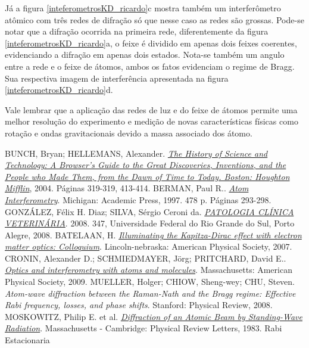 	\par Já a figura \ref{inteferometrosKD_ricardo}c mostra também um interferômetro atômico com três redes de difração só que nesse caso as redes são grossas. Pode-se notar que a difração ocorrida na primeira rede, diferentemente da figura \ref{inteferometrosKD_ricardo}a, o feixe é dividido em apenas dois feixes coerentes, evidenciando a difração em apenas dois estados. Nota-se também um angulo entre a rede e o feixe de átomos, ambos os fatos evidenciam o regime de Bragg. Sua respectiva imagem de interferência apresentada na figura \ref{inteferometrosKD_ricardo}d.
	
	\par Vale lembrar que a aplicação das redes de luz e do feixe de átomos permite uma melhor resolução do experimento e medição de novas características físicas como rotação e ondas gravitacionais devido a massa associado dos átomo.

  BUNCH, Bryan; HELLEMANS, Alexander. \href{https://www.scribd.com/doc/150209428/The-History-of-Science-and-Technology}\textit{The History of Science and Technology: A Browser's Guide to the Great Discoveries, Inventions, and the People who Made Them, from the Dawn of Time to Today. Boston: Houghton Mifflin}, 2004. Páginas 319-319, 413-414.
  BERMAN, Paul R.. \href{https://www.scribd.com/read/282500311/Atom-Interferometry}\textit{Atom Interferometry}. Michigan: Academic Press, 1997. 478 p. Páginas 293-298.
  GONZÁLEZ, Félix H. Diaz; SILVA, Sérgio Ceroni da. \href{https://www.ufrgs.br/lacvet/livros/Analises_Clinicas_Vet.pdf}\textit{PATOLOGIA CLÍNICA VETERINÁRIA}. 2008. 347, Universidade Federal do Rio Grande do Sul, Porto Alegre, 2008.
  BATELAAN, H. \href{https://journals.aps.org/rmp/pdf/10.1103/RevModPhys.79.929}\textit{Illuminating the Kapitza-Dirac effect with electron matter optics: Colloquium}. Lincoln-nebraska: American Physical Society, 2007.
  CRONIN, Alexander D.; SCHMIEDMAYER, Jörg; PRITCHARD, David E.. \href{https://journals.aps.org/rmp/pdf/10.1103/RevModPhys.81.1051}\textit{Optics and interferometry with atoms and molecules}. Massachusetts: American Physical Society, 2009.
  MUELLER, Holger; CHIOW, Sheng-wey; CHU, Steven. \textit{Atom-wave diffraction between the Raman-Nath and the Bragg regime: Effective Rabi frequency, losses, and phase shifts}. Stanford: Physical Review, 2008.
  MOSKOWITZ, Philip E. et al. \href{https://journals.aps.org/prl/pdf/10.1103/PhysRevLett.51.370}\textit{Diffraction of an Atomic Beam by Standing-Wave Radiation}. Massachusetts - Cambridge: Physical Review Letters, 1983.
  Rabi
  Estacionaria


